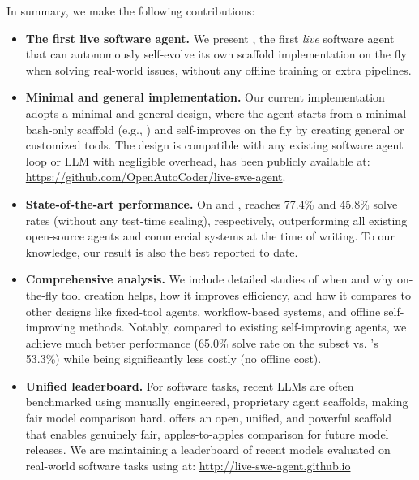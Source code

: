 In summary, we make the following contributions:

\begin{itemize}[leftmargin=*]
\item \textbf{The first live software agent.}  We present \livesweagent, the first \emph{live} software agent that can autonomously self-evolve its own scaffold implementation on the fly when solving real-world issues,
without any offline training or extra pipelines.
\item \textbf{Minimal and general implementation.} Our current implementation adopts a minimal and general design, where the agent starts from a minimal bash-only scaffold (e.g., \minisweagent) and self-improves on the fly by creating general or customized tools. The design is compatible with any existing software agent loop or LLM with negligible overhead, has been publicly available at: {\color{purple}\url{https://github.com/OpenAutoCoder/live-swe-agent}}.
\item \textbf{State-of-the-art performance.}
On \sbv and \swebenchpro, \livesweagent reaches 77.4\% and 45.8\% solve rates (without any test-time scaling), respectively, outperforming all existing open-source agents and commercial systems at the time of writing. To our knowledge, our \swebenchpro result is also the best reported to date.
\item \textbf{Comprehensive analysis.} We include detailed studies of when and why on-the-fly tool creation helps, how it improves efficiency, and how it compares to other designs like fixed-tool agents, workflow-based systems, and offline self-improving methods. Notably, compared to existing self-improving agents, we achieve much better performance (65.0\% solve rate on the  subset vs. \dgm's 53.3\%)
while being significantly less costly (no offline cost).

\item \textbf{Unified leaderboard.} For software tasks, recent LLMs are often benchmarked using manually engineered, proprietary agent scaffolds, making fair model comparison hard. 
 \livesweagent offers an open, unified, and powerful scaffold that enables genuinely fair, apples-to-apples comparison for future model releases. We are maintaining a leaderboard of recent models evaluated on real-world software tasks using \livesweagent at: {\color{purple}\url{http://live-swe-agent.github.io}}
\end{itemize}

